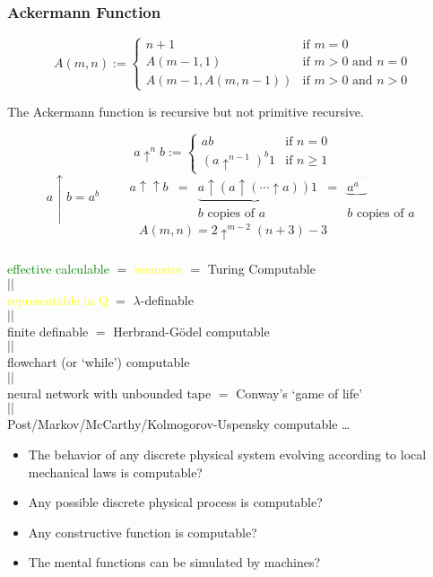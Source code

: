 \documentclass[UTF8,aspectratio=43,11pt,colorlinks,compress,openany]{beamer}%
\begin{document}
\begin{frame}\frametitle{Ackermann Function}
	\begin{definition}
		\[A(m,n):=
		\begin{cases}
		n+1&\mbox{if }m=0\\
		A(m-1,1)&{\mbox{if }}m>0{\mbox{ and }}n=0\\
		A(m-1,A(m,n-1))&{\mbox{if }}m>0{\mbox{ and }}n>0
		\end{cases}\]
	\end{definition}
	\begin{theorem}
		The Ackermann function is recursive but not primitive recursive.
	\end{theorem}
	\vspace{-1ex}
	\[a\uparrow^nb:=
	\begin{cases}
	ab&{\mbox{if }}n=0\\
	(a\uparrow^{n-1})^b1&{\mbox{if }}n\geq 1
	\end{cases}\]
	\[a\uparrow b=a^b\qquad
	\begin{matrix}
	a\uparrow \uparrow b&=&\underbrace{a\uparrow(a\uparrow (\cdots \uparrow a))}1&=& \underbrace{a^{a^{{}^{.\,^{.\,^{.\,^{a}}}}}}}\\&&b{\mbox{ copies of }}a&&b{\mbox{ copies of }}a
	\end{matrix}\]
	\[A(m,n)=2\uparrow^{m-2}(n+3)-3\]
\end{frame}

\begin{frame}\frametitle{}
	\begin{thesis}
		\begin{center}
			\textcolor{green}{effective calculable} $=$ \textcolor{yellow}{recursive} $=$ Turing Computable\\
			$\scriptstyle ||$\\
			\textcolor{yellow}{representable in $\mathrm{Q}$} $=$ $\lambda$-definable\\
			$\scriptstyle ||$\\
			finite definable $=$ Herbrand-G\"odel computable\\
			$\scriptstyle ||$\\
			flowchart (or `while') computable\\
			$\scriptstyle ||$\\
			neural network with unbounded tape $=$ Conway's `game of life'\\
			$\scriptstyle ||$\\
			Post/Markov/McCarthy/Kolmogorov-Uspensky computable \ldots
		\end{center}
	\end{thesis}
	\begin{itemize}
		\item The behavior of any discrete physical system evolving according to local mechanical laws is computable?
		\item Any possible discrete physical process is computable?
		\item Any constructive function is computable?
		\item The mental functions can be simulated by machines?
	\end{itemize}
\end{frame}
\end{document}
